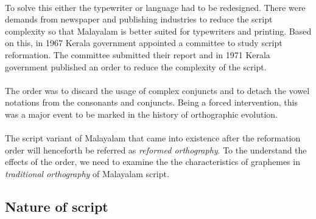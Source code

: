 \documentclass[10pt]{article}
\begin{document}
\paragraph{}
To solve this either the typewriter or language had to be redesigned. There were demands from newspaper and publishing industries to reduce the script complexity so that Malayalam is better suited for typewriters and printing. Based on this, in 1967 Kerala government appointed a committee to study script reformation. The committee submitted their report and in 1971 Kerala government published an order to reduce the complexity of the script\cite{1971go}.

\paragraph{}
The order was to discard the usage of complex conjuncts and to detach the vowel notations from the consonants and conjuncts. Being a forced intervention, this was a major event to be marked in the history of orthographic evolution. 

\paragraph{}
The script variant of Malayalam that came into existence after the reformation order will henceforth be referred as \textit{reformed orthography}. To the understand the effects of the order, we need to examine the the characteristics of graphemes in \textit{traditional orthography} of Malayalam script.

\subsection{Nature of script}
\end{document}
